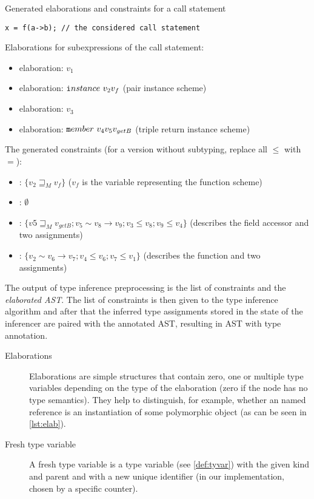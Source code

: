 \begin{listing}
    \caption{Generated elaborations and constraints for a call statement}
    \label{lst:elab}

    \begin{lstlisting}
x = f(a->b); // the considered call statement
    \end{lstlisting}

    Elaborations for subexpressions of the call statement:
    \begin{itemize}
        \item {} elaboration: $v_1$

        \item {} elaboration: $\mtt instance\ v_2 v_f$ (pair instance scheme)

        \item {} elaboration: $v_3$

        \item {} elaboration: $\mtt member\ v_4 v_5 v_{getB}$ (triple return instance scheme)
    \end{itemize}

    The generated constraints (for a version without subtyping, replace all $\leq$ with $=$):
    \begin{itemize}
        \item {}: $\{v_2 \sqsupseteq_M v_f\}$ ($v_f$ is the variable representing the function scheme)

        \item {}: $\emptyset$

        \item {}: $\{v5 \sqsupseteq_M v_{getB}; v_5 \sim v_8 \to v_9; v_3 \leq v_8; v_9 \leq v_4\}$ (describes the field accessor and two assignments)

        \item {}: $\{v_2 \sim v_6 \to v_7; v_4 \leq v_6; v_7 \leq v_1\}$ (describes the function and two assignments)
    \end{itemize}
\end{listing}

The output of type inference preprocessing is the list of constraints and the \emph{elaborated AST}. The list of constraints is then given to the type inference algorithm and after that the inferred type assignments stored in the state of the inferencer are paired with the annotated AST, resulting in AST with type annotation.

\begin{description}
    \item[Elaborations] Elaborations are simple structures that contain zero, one or multiple type variables depending on the type of the elaboration (zero if the node has no type semantics). They help to distinguish, for example, whether an named reference is an instantiation of some polymorphic object (as can be seen in \cref{lst:elab}).

    \item[Fresh type variable] A fresh type variable is a type variable (see \cref{def:tyvar}) with the given kind and parent and with a new unique identifier (in our implementation, chosen by a specific counter).
\end{description}

